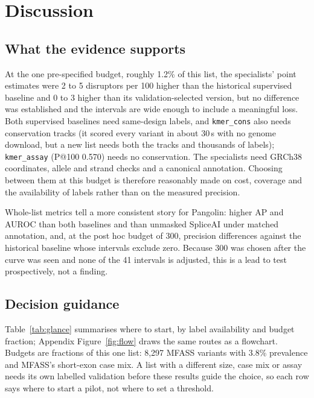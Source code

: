 \documentclass[11pt]{article}
\makeatletter
\newcommand{\cfg}[1]{\texttt{#1}}
\newcommand{\pk}[1]{P@#1}
\makeatother
\begin{document}
\section{Discussion}\label{sec:discussion}

\subsection{What the evidence supports}
At the one pre-specified budget, roughly 1.2\% of this list, the specialists' point estimates were 2 to 5
disruptors per 100 higher than the historical supervised baseline and 0 to 3 higher than its validation-selected
version, but no difference was established and the intervals are wide enough to include a meaningful loss. Both
supervised baselines need same-design labels, and \cfg{kmer\_cons} also needs conservation tracks (it scored every
variant in about 30\,s with no genome download, but a new list needs both the tracks and thousands of labels);
\cfg{kmer\_assay} (\pk{100} 0.570) needs no conservation. The specialists need GRCh38 coordinates, allele and strand
checks and a canonical annotation. Choosing between them at this budget is therefore
reasonably made on cost, coverage and the availability of labels rather than on the measured precision.

Whole-list metrics tell a more consistent story for Pangolin: higher AP and AUROC than both baselines and than
unmasked SpliceAI under matched annotation, and, at the post hoc budget of 300, precision differences against the
historical baseline whose intervals exclude zero. Because 300 was chosen after the curve was seen and none of the
41 intervals is adjusted, this is a lead to test prospectively, not a finding.

\subsection{Decision guidance}
Table~\ref{tab:glance} summarises where to start, by label availability and budget fraction; Appendix
Figure~\ref{fig:flow} draws the same routes as a flowchart. Budgets are fractions of this one list: 8,297 MFASS
variants with 3.8\% prevalence and MFASS's short-exon case mix. A list with a different size, case mix or assay
needs its own labelled validation before these results guide the choice, so each row says where to start a pilot,
not where to set a threshold.
\end{document}
